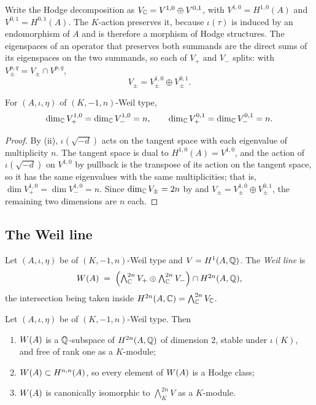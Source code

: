 Write the Hodge decomposition as $V_{\mathbb{C}}=V^{1,0}\oplus V^{0,1}$, with
$V^{1,0}=H^{1,0}(A)$ and $V^{0,1}=H^{0,1}(A)$. The $K$-action preserves it,
because $\iota(\tau)$ is induced by an endomorphism of $A$ and is therefore a
morphism of Hodge structures. The eigenspaces of an operator that preserves
both summands are the direct sums of its eigenspaces on the two summands, so
each of $V_{+}$ and $V_{-}$ splits: with $V^{p,q}_{\pm}=V_{\pm}\cap V^{p,q}$,
\begin{equation}\label{eq:bisplit}
  V_{\pm}=V_{\pm}^{1,0}\oplus V_{\pm}^{0,1}.
\end{equation}

\begin{lemma}\label{lem:balanced}
For $(A,\iota,\eta)$ of $(K,-1,n)$-Weil type,
\[
  \dim_{\mathbb{C}}V_{+}^{1,0}=\dim_{\mathbb{C}}V_{-}^{1,0}=n,
  \qquad
  \dim_{\mathbb{C}}V_{+}^{0,1}=\dim_{\mathbb{C}}V_{-}^{0,1}=n .
\]
\end{lemma}

\begin{proof}
By (ii), $\iota(\sqrt{-d})$ acts on the tangent space with
each eigenvalue of multiplicity $n$. The tangent space is dual to
$H^{1,0}(A)=V^{1,0}$, and the action of $\iota(\sqrt{-d})$ on $V^{1,0}$ by
pullback is the transpose of its action on the tangent space, so it has the
same eigenvalues with the same multiplicities; that is,
$\dim V^{1,0}_{+}=\dim V^{1,0}_{-}=n$. Since $\dim_{\mathbb{C}}V_{\pm}=2n$ by
 and $V_{\pm}=V^{1,0}_{\pm}\oplus V^{0,1}_{\pm}$, the
remaining two dimensions are $n$ each.
\end{proof}

\subsection{The Weil line}

\begin{definition}\label{def:weilline}
Let $(A,\iota,\eta)$ be of $(K,-1,n)$-Weil type and $V=H^{1}(A,\mathbb{Q})$. The
\emph{Weil line} is
\[
  W(A)\;=\;\Bigl(\textstyle\bigwedge^{2n}_{\mathbb{C}}V_{+}\oplus
  \bigwedge^{2n}_{\mathbb{C}}V_{-}\Bigr)\cap H^{2n}(A,\mathbb{Q}),
\]
the intersection being taken inside
$H^{2n}(A,\mathbb{C})=\bigwedge^{2n}_{\mathbb{C}}V_{\mathbb{C}}$.
\end{definition}

\begin{proposition}\label{prop:weilline}
Let $(A,\iota,\eta)$ be of $(K,-1,n)$-Weil type. Then
\begin{enumerate}[label=\textup{(\roman*)},nosep]
\item $W(A)$ is a $\mathbb{Q}$-subspace of $H^{2n}(A,\mathbb{Q})$ of dimension $2$, stable
  under $\iota(K)$, and free of rank one as a $K$-module;
\item $W(A)\subset H^{n,n}(A)$, so every element of $W(A)$ is a Hodge class;
\item $W(A)$ is canonically isomorphic to $\bigwedge^{2n}_{K}V$ as a
  $K$-module.
\end{enumerate}
\end{proposition}

